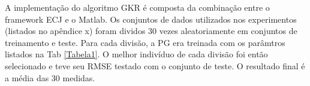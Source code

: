 
A implementação do algoritmo GKR é composta da combinação entre o framework ECJ \cite{luke2015b} e o Matlab. Os conjuntos de dados utilizados nos experimentos (listados no apêndice x) foram dividos 30 vezes aleatoriamente em conjuntos de treinamento e teste. Para cada divisão, a PG era treinada com os parâmtros listados na Tab \ref{Tabela1}. O melhor indivíduo de cada divisão foi então selecionado e teve seu RMSE testado com o conjunto de teste. O resultado final é a média das 30 medidas.

